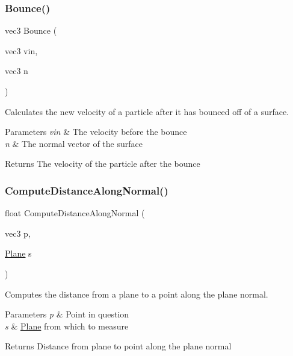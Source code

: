 \subsubsection{\texorpdfstring{Bounce()}{Bounce()}}
{\footnotesize\ttfamily vec3 Bounce (\begin{DoxyParamCaption}\item[{vec3}]{vin,  }\item[{vec3}]{n }\end{DoxyParamCaption})}



Calculates the new velocity of a particle after it has bounced off of a surface. 


\begin{DoxyParams}{Parameters}
{\em vin} & The velocity before the bounce \\
\hline
{\em n} & The normal vector of the surface \\
\hline
\end{DoxyParams}
\begin{DoxyReturn}{Returns}
The velocity of the particle after the bounce 
\end{DoxyReturn}
\mbox{\label{bouncing__particles_8comp_a5393b9632a296e4a790b4d9bbcf2fa34}} 
\subsubsection{\texorpdfstring{Compute\+Distance\+Along\+Normal()}{ComputeDistanceAlongNormal()}}
{\footnotesize\ttfamily float Compute\+Distance\+Along\+Normal (\begin{DoxyParamCaption}\item[{vec3}]{p,  }\item[{\hyperlink{struct_plane}{Plane}}]{s }\end{DoxyParamCaption})}



Computes the distance from a plane to a point along the plane normal. 


\begin{DoxyParams}{Parameters}
{\em p} & Point in question \\
\hline
{\em s} & \hyperlink{struct_plane}{Plane} from which to measure \\
\hline
\end{DoxyParams}
\begin{DoxyReturn}{Returns}
Distance from plane to point along the plane normal 
\end{DoxyReturn}
\mbox{\label{bouncing__particles_8comp_af355fbdc8876dcfd4808b4b97a33753a}} 
